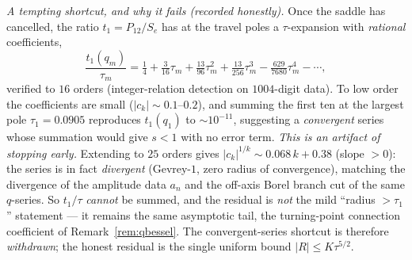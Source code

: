 \begin{remark}[The assembly: $R=O(\tau^{5/2})$ via the q-Bessel stationary-phase asymptotic coupled to the
travel-block phase]
\emph{A tempting shortcut, and why it fails \textup(recorded honestly\textup).} Once the saddle has cancelled,
the ratio $t_1=P_{12}/S_e$ has at the travel poles a $\tau$-expansion with \emph{rational} coefficients,
\begin{equation}\label{eq:t1series}
   \frac{t_1(q_m)}{\tau_m}=\tfrac14+\tfrac3{16}\tau_m+\tfrac{13}{96}\tau_m^2+\tfrac{13}{256}\tau_m^3
   -\tfrac{629}{7680}\tau_m^4-\cdots,
\end{equation}
verified to $16$ orders (integer-relation detection on $1004$-digit data). To low order the coefficients are small
($|c_k|\sim0.1$--$0.2$), and summing the first ten at the largest pole $\tau_1=0.0905$ reproduces $t_1(q_1)$ to
$\sim10^{-11}$, suggesting a \emph{convergent} series whose summation would give $s<1$ with no error term.
\emph{This is an artifact of stopping early.} Extending to $25$ orders gives $|c_k|^{1/k}\sim0.068\,k+0.38$
(slope $>0$): the series is in fact \emph{divergent} (Gevrey-$1$, zero radius of convergence), matching the
divergence of the amplitude data $a_n$ and the off-axis Borel branch cut of the same $q$-series. So $t_1/\tau$
\emph{cannot} be summed, and the residual is \emph{not} the mild ``radius $>\tau_1$'' statement --- it remains the
same asymptotic tail, the turning-point connection coefficient of Remark~\ref{rem:qbessel}. The convergent-series
shortcut is therefore \emph{withdrawn}; the honest residual is the single uniform bound $|R|\le K\tau^{5/2}$.
\end{remark}
